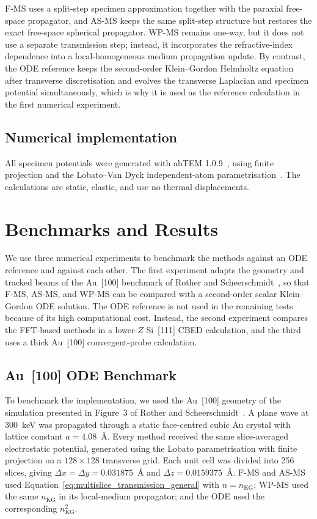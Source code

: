 \documentclass[preprint,12pt,number]{elsarticle}
\begin{document}
F-MS uses a split-step specimen approximation together with the paraxial
free-space propagator, and AS-MS keeps the same split-step structure but
restores the exact free-space spherical propagator. WP-MS remains one-way, but
it does not use a separate transmission step; instead, it incorporates the
refractive-index dependence into a local-homogeneous medium propagation update.
By contrast, the ODE reference keeps the second-order Klein--Gordon Helmholtz
equation after transverse discretisation and evolves the transverse Laplacian
and specimen potential simultaneously, which is why it is used as the reference
calculation in the first numerical experiment.

\subsection{Numerical implementation}
\label{sec:numerical_implementation}

All specimen potentials were generated with abTEM
1.0.9~\cite{MadsenSusi2021}, using finite projection and the Lobato--Van Dyck
independent-atom parametrisation~\cite{LobatoVanDyck2014}. The calculations are
static, elastic, and use no thermal displacements.
\section{Benchmarks and Results}
\label{sec:results}

We use three numerical experiments to benchmark the methods against an ODE
reference and against each other. The first experiment adapts the geometry and
tracked beams of the Au~[100] benchmark of Rother and
Scheerschmidt~\cite{RotherScheerschmidt2009}, so that
F-MS, AS-MS, and WP-MS can be compared with a second-order scalar
Klein--Gordon ODE solution. The ODE reference is not used in the
remaining tests because of its high computational cost. Instead, the second
experiment compares the FFT-based methods in a lower-$Z$ Si~[111] CBED
calculation, and the third uses a thick Au~[100] convergent-probe calculation.

\subsection{Au~[100] ODE Benchmark}
\label{sec:verification}

To benchmark the implementation, we used the Au~[100] geometry of the
simulation presented in Figure~3 of Rother and
Scheerschmidt~\cite{RotherScheerschmidt2009}. A plane wave at 300~keV was
propagated through a static face-centred cubic Au crystal with lattice constant
$a=4.08$~\AA. Every method received the same slice-averaged electrostatic
potential, generated using the Lobato parametrisation with finite projection
on a $128\times128$ transverse grid. Each unit cell was divided into 256
slices, giving $\Delta x=\Delta y=0.031875$~\AA{} and
$\Delta z=0.0159375$~\AA. F-MS and AS-MS used
Equation~\eqref{eq:multislice_transmission_general} with $n=n_\mathrm{KG}$;
WP-MS used the same $n_\mathrm{KG}$ in its local-medium propagator; and the ODE
used the corresponding $n_\mathrm{KG}^2$. 
\end{document}
